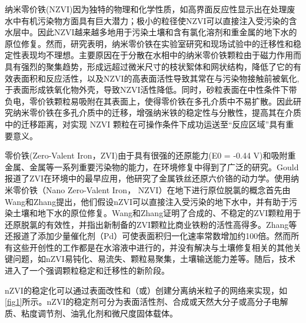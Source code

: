 

纳米零价铁(NZVI)因为独特的物理和化学性质，如高界面反应性显示出在处理废水中有机污染物方面具有巨大潜力；极小的粒径使NZVI可以直接注入受污染的含水层中\cite{2}。因此NZVI越来越多地用于污染土壤和含有氯化溶剂和重金属的地下水的原位修复\cite{1,WOS:000704630800008,REN2022127322,LI201916}。然而，研究表明，纳米零价铁在实验室研究和现场试验中的迁移性和稳定性表现均不理想\cite{3}。主要原因在于分散在水相中的纳米零价铁颗粒由于磁力作用而具有强烈的聚集趋势，形成远超过微米尺寸的枝状絮体和网状结构，降低了它的有效表面积和反应活性\cite{4}，以及NZVI的高表面活性导致其常在与污染物接触前被氧化,于表面形成铁氧化物外壳，导致NZVI活性降低\cite{HUANG2016168}。同时，砂粒表面在中性条件下带负电，零价铁颗粒易吸附在其表面上\cite{5}，使得零价铁在多孔介质中不易扩散。因此研究纳米零价铁在多孔介质中的迁移，增强纳米铁的稳定性与分散性，提高其在介质中的迁移距离，对实现 NZVI 颗粒在可操作条件下成功运送至“反应区域”具有重要意义。


零价铁(Zero-Valent Iron，ZVI)由于具有很强的还原能力(E0 = -0.44 V)和吸附重金属、金属等一系列重要污染物的能力，在环境修复中得到了广泛的研究\cite{6}。Gould\cite{7}报道了ZVI在环境中的最早应用，他研究了金属铁丝还原六价铬的动力学。使用纳米零价铁（Nano Zero-Valent Iron， NZVI）在地下进行原位脱氯的概念首先由Wang和Zhang\cite{8}提出，他们假设nZVI可以直接注入受污染的地下水中，并有助于污染土壤和地下水的原位修复\cite{1}。Wang和Zhang\cite{8}证明了合成的、不稳定的ZVI颗粒用于还原脱氯的有效性，并指出新制备的ZVI颗粒比商业铁粉的活性高得多。Zhang等\cite{9}还报道了添加少量催化剂（Pd）可使表面积归一化速率常数增加约100倍。然而所有这些开创性的工作都是在水溶液中进行的，并没有解决与土壤修复相关的其他关键问题，如nZVI易钝化、易流失、颗粒易聚集，土壤输送能力差等。随后，技术进入了一个强调颗粒稳定和迁移性的新阶段。

nZVI的稳定化可以通过表面改性和（或）创建分离纳米粒子的网络来实现，如\cref{fig1}所示。nZVI的稳定剂可分为表面活性剂、合成或天然大分子或高分子电解质、粘度调节剂、油乳化剂和微尺度固体载体。 

